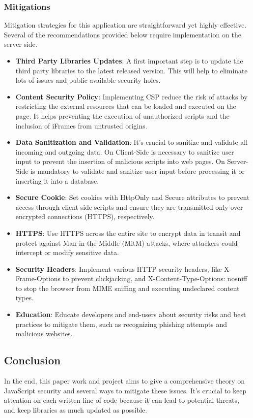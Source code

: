 \documentclass{article}
\begin{document}
\newpage

\subsubsection{Mitigations}
Mitigation strategies for this application are straightforward yet highly effective. Several of the recommendations provided below require implementation on the server side.
\begin{itemize}
	\item \textbf{Third Party Libraries Updates}: A first important step is to update the third party libraries to the latest released version. This will help to eliminate lots of issues and public available security holes.
	\item \textbf{Content Security Policy}: Implementing CSP reduce the risk of attacks by restricting the external resources that can be loaded and executed on the page. It helps preventing the execution of unauthorized scripts and the inclusion of iFrames from untrusted origins.
	\item \textbf{Data Sanitization and Validation}: It's crucial to sanitize and validate all incoming and outgoing data. On Client-Side is necessary to sanitize user input to prevent the insertion of malicious scripts into web pages. On Server-Side is mandatory to validate and sanitize user input before processing it or inserting it into a database.
	\item \textbf{Secure Cookie}: Set cookies with HttpOnly and Secure attributes to prevent access through client-side scripts and ensure they are transmitted only over encrypted connections (HTTPS), respectively.
	\item \textbf{HTTPS}: Use HTTPS across the entire site to encrypt data in transit and protect against Man-in-the-Middle (MitM) attacks, where attackers could intercept or modify sensitive data.
	\item \textbf{Security Headers}: Implement various HTTP security headers, like X-Frame-Options to prevent clickjacking, and X-Content-Type-Options: nosniff to stop the browser from MIME sniffing and executing undeclared content types.
	\item \textbf{Education}: Educate developers and end-users about security risks and best practices to mitigate them, such as recognizing phishing attempts and malicious websites.
\end{itemize}

\subsection{Conclusion}
In the end, this paper work and project aims to give a comprehensive theory on JavaScript security and several ways to mitigate these issues. It's crucial to keep attention on each written line of code because it can lead to potential threats, and keep libraries as much updated as possible.
\end{document}
